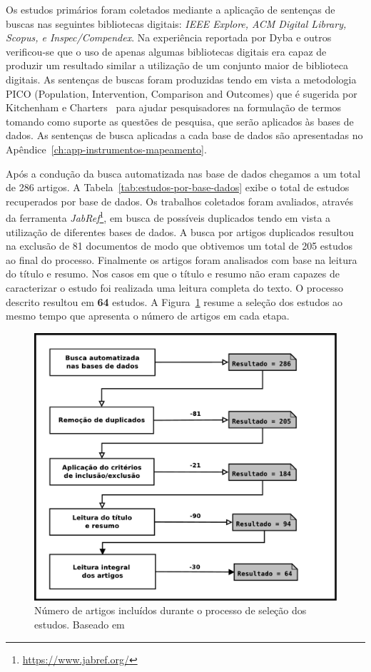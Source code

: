 Os estudos primários foram coletados mediante a aplicação de sentenças de buscas
nas seguintes bibliotecas digitais: \textit{IEEE Explore, ACM Digital Library,
	Scopus, e Inspec/Compendex}. Na experiência reportada por Dyba e
outros~\cite{dybaa2007applying} verificou-se que o uso de apenas algumas
bibliotecas digitais era capaz de produzir um resultado similar a utilização de
um conjunto maior de biblioteca digitais. As sentenças de buscas foram
produzidas tendo em vista a metodologia PICO (Population, Intervention,
Comparison and Outcomes) que é sugerida por Kitchenham e
Charters~\cite{keele2007guidelines} para ajudar pesquisadores na formulação de
termos tomando como suporte as questões de pesquisa, que serão aplicados às
bases de dados. As sentenças de busca aplicadas a cada base de dados são
apresentadas no Apêndice~\ref{ch:app-instrumentos-mapeamento}.

Após a condução da busca automatizada nas base de dados chegamos a um total de
286 artigos. A Tabela~\ref{tab:estudos-por-base-dados} exibe o total de estudos
recuperados por base de dados.  Os trabalhos coletados foram avaliados, através
da ferramenta \textit{JabRef}\footnote{\url{https://www.jabref.org/}}, em busca
de possíveis duplicados tendo em vista a utilização de diferentes bases de
dados. A busca por artigos duplicados resultou na exclusão de 81 documentos de
modo que obtivemos um total de 205 estudos ao final do processo. Finalmente os
artigos foram analisados com base na leitura do título e resumo. Nos casos em
que o título e resumo não eram capazes de caracterizar o estudo foi realizada
uma leitura completa do texto. O processo descrito resultou em \textbf{64}
estudos. A Figura~\ref{fig:diagrama-processo-selecao} resume a seleção dos
estudos ao mesmo tempo que apresenta o número de artigos em cada etapa.

\begin{figure} \centering \includegraphics[width=0.75\linewidth]
	{./chapter-mapeamento-sistematico/img/diagrama-processo-selecao.pdf}
	\caption{Número de artigos incluídos durante o processo de seleção dos
		estudos. Baseado
		em~\cite{Petersen2015}}\label{fig:diagrama-processo-selecao}
\end{figure}

